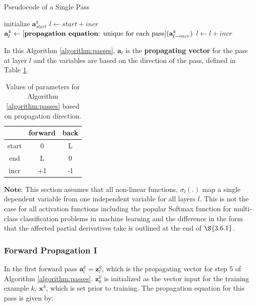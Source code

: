 \documentclass[letterpaper,12pt,titlepage,oneside,final]{book}
\begin{document}
	\begin{algorithm}
		\caption{Pseudocode of a Single Pass}\label{euclid}
		\begin{algorithmic}[1]
			\State initialize $\mathbf{a}_{start}^{k}$
			\State $ l \gets start + incr$
			\State $\mathbf{a}_{l}^{k} \gets \text{[\textbf{propagation equation}: unique for each pass]}(\mathbf{a}_{l-incr}^{k})$
			\State $l \gets l + incr$
			\EndWhile
			\EndProcedure
		\end{algorithmic}
		\label{algorithm:passes}
	\end{algorithm}
	In this Algorithm \ref{algorithm:passes}, $\mathbf{a}_{l}$ is the \textbf{propagating vector} for the pass at layer $l$ and the variables are based on the direction of the pass, defined in Table \ref{table:passes}.
	\begin{table}
		\begin{center}
			\begin{tabular}{ |c|c|c| } 
				\hline
				& forward & back \\
				\hline
				start & 0 & L \\ 
				end & L & 0 \\ 
				incr & +1 & -1 \\ 
				\hline
			\end{tabular}
			\caption{Values of parameters for Algorithm \ref{algorithm:passes} based on propagation direction.}
			\label{table:passes}
		\end{center}
	\end{table}
	$\mathbf{Note}$: This section assumes that all non-linear functions, $\sigma_{l}(.)$ map a single dependent variable from one independent variable for all layers $l$. This is not the case for all activation functions including the popular Softmax function for multi-class classification problems in machine learning and the difference in the form that the affected partial derivatives take is outlined at the end of $\S{3.6.1}$.
	
	\subsubsection{Forward Propagation I}
	
	In the first forward pass $\mathbf{a}^{k}_{l} = \mathbf{z}_{l}^{k}$, which is the propagating vector for step 5 of Algorithm \ref{algorithm:passes}.  $\mathbf{z}_{0}^{k}$ is initialized as the vector input for the training example $k$, $\mathbf{x}^{k}$, which is set prior to training. The propagation equation for this pass is given by:
	
\end{document}
